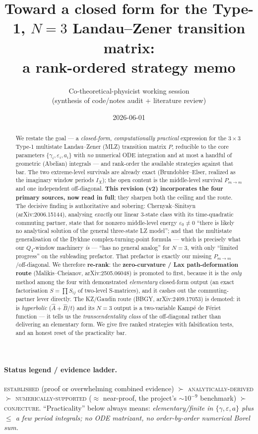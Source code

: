 \documentclass[11pt]{article}
\title{Toward a closed form for the Type-1, $N{=}3$ Landau--Zener transition matrix:\\
a rank-ordered strategy memo}
\author{Co-theoretical-physicist working session \\ \small (synthesis of code/notes audit + literature review)}
\date{2026-06-01}
\newcommand{\eps}{\varepsilon}
\newcommand{\Pmid}{P_{m\to m}}
\begin{document}
\maketitle

\begin{abstract}
We restate the goal --- a \emph{closed-form, computationally practical} expression for the
$3\times3$ Type-1 multistate Landau--Zener (MLZ) transition matrix $P$, reducible to the core
parameters $\{\gamma_i,\eps_i,a_i\}$ with \emph{no} numerical ODE integration and at most a
handful of geometric (Abelian) integrals --- and rank-order the available strategies against
that bar. The two extreme-level survivals are already exact (Brundobler--Elser, realized as the
imaginary window periods $I_X$); the open content is the middle-level survival $\Pmid$ and one
independent off-diagonal. \textbf{This revision (v2) incorporates the four primary sources, now
read in full}; they sharpen both the ceiling and the route. The decisive finding is
authoritative and sobering: Chernyak--Sinitsyn (arXiv:2006.15144), analysing \emph{exactly} our
linear $3$-state class with its time-quadratic commuting partner, state that for nonzero
middle-level energy $\eps_0\ne0$ ``there is likely no analytical solution of the general
three-state LZ model''; and that the multistate generalisation of the Dykhne complex-turning-point
formula --- which is precisely what our $Q_4$-window machinery \emph{is} --- ``has no general
analog'' for $N=3$, with only ``limited progress'' on the subleading prefactor. That prefactor is
exactly our missing $\Pmid$/off-diagonal. We therefore \textbf{re-rank}: the
\textbf{zero-curvature / Lax path-deformation route} (Malikis--Cheianov, arXiv:2505.06048) is
promoted to first, because it is the \emph{only} method among the four with demonstrated
\emph{elementary} closed-form output (an exact factorisation $S=\prod S_{ij}$ of two-level
S-matrices), and it cashes out the commuting-partner lever directly. The KZ/Gaudin route (BBGY,
arXiv:2409.17053) is demoted: it is \emph{hyperbolic} ($\hat A+\hat B/t$) and its $N{=}3$ output is
a two-variable Kamp\'e de F\'eriet function --- it tells us the \emph{transcendentality class} of
the off-diagonal rather than delivering an elementary form. We give five ranked strategies with
falsification tests, and an honest reset of the practicality bar.
\end{abstract}

\paragraph{Status legend / evidence ladder.}
\textsc{established} (proof or overwhelming combined evidence) $\succ$
\textsc{analytically-derived} $\succ$ \textsc{numerically-supported} ($\approx$ near-proof, the
project's $\sim10^{-9}$ benchmark) $\succ$ \textsc{conjecture}. ``Practicality'' below always
means: \emph{elementary/finite in $\{\gamma,\eps,a\}$ plus $\le$ a few period integrals; no ODE
matrizant, no order-by-order numerical Borel sum.}
\end{document}
